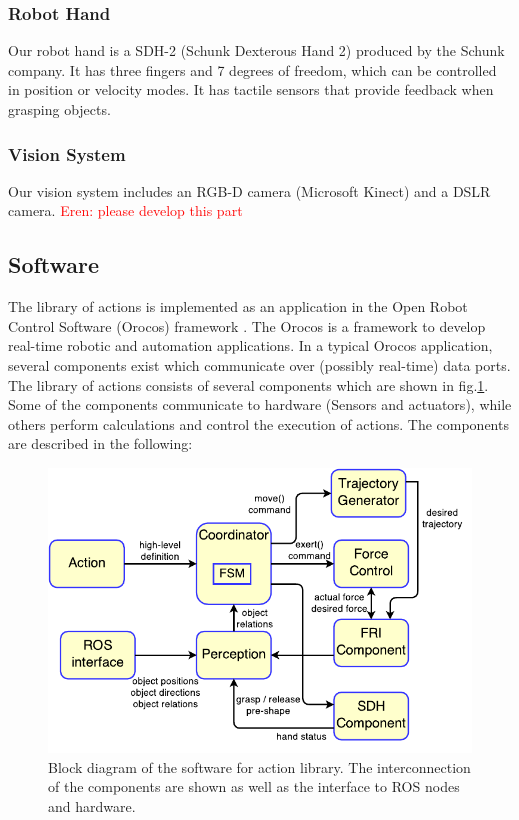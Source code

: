 \subsubsection{Robot Hand}
Our robot hand is a SDH-2 (Schunk Dexterous Hand 2) produced by the Schunk company.
It has three fingers and 7 degrees of freedom, which can be controlled in position or velocity modes.
It has tactile sensors that provide feedback when grasping objects.


\subsubsection{Vision System}
Our vision system includes an RGB-D camera (Microsoft Kinect) and a DSLR camera.
\textcolor{red}{Eren: please develop this part}


\subsection{Software}
\label{sec:software}
The library of actions is implemented as an application in the Open Robot Control Software (Orocos) framework \cite{rtt-url,soetens2006}.
The Orocos is a framework to develop real-time robotic and automation applications.
In a typical Orocos application, several components exist which communicate over (possibly real-time) data ports.
The library of actions consists of several components which are shown in fig.\ref{fig:software_structure}.
Some of the components communicate to hardware (Sensors and actuators), while others perform calculations and control the execution of actions.
The components are described in the following:
\begin{figure}
      \centering
      \includegraphics[scale=1]{./pdf/software_structure.pdf}
      \caption{ Block diagram of the software for action library.
      The interconnection of the components are shown as well as the interface to ROS nodes and hardware.
}
      \label{fig:software_structure}
\end{figure}




